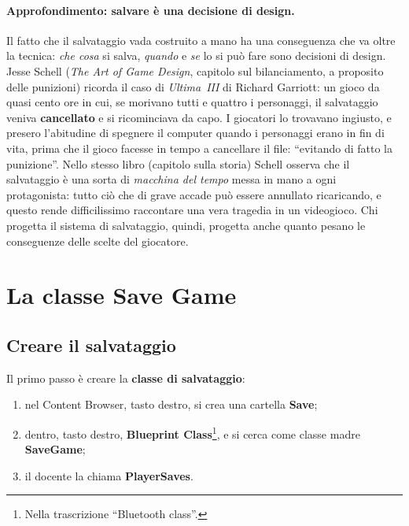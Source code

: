 \paragraph{Approfondimento: salvare è una decisione di design.} Il fatto che
il salvataggio vada costruito a mano ha una conseguenza che va oltre la
tecnica: \emph{che cosa} si salva, \emph{quando} e \emph{se} lo si può fare
sono decisioni di design. Jesse Schell (\emph{The Art of Game Design},
capitolo sul bilanciamento, a proposito delle punizioni) ricorda il caso di
\emph{Ultima~III} di Richard Garriott: un gioco da quasi cento ore in cui, se
morivano tutti e quattro i personaggi, il salvataggio veniva
\textbf{cancellato} e si ricominciava da capo. I giocatori lo trovavano
ingiusto, e presero l'abitudine di spegnere il computer quando i personaggi
erano in fin di vita, prima che il gioco facesse in tempo a cancellare il file:
``evitando di fatto la punizione''. Nello stesso libro (capitolo sulla storia)
Schell osserva che il salvataggio è una sorta di \emph{macchina del tempo}
messa in mano a ogni protagonista: tutto ciò che di grave accade può essere
annullato ricaricando, e questo rende difficilissimo raccontare una vera
tragedia in un videogioco. Chi progetta il sistema di salvataggio, quindi,
progetta anche quanto pesano le conseguenze delle scelte del giocatore.

\section{La classe Save Game}
\label{gd16:sec:savegame}

\subsection{Creare il salvataggio}

Il primo passo è creare la \textbf{classe di salvataggio}:
\begin{enumerate}
  \item nel Content Browser, tasto destro, si crea una cartella
        \textbf{Save};
  \item dentro, tasto destro, \textbf{Blueprint Class}\footnote{Nella
        trascrizione ``Bluetooth class''.}, e si cerca come classe madre
        \textbf{SaveGame};
  \item il docente la chiama \textbf{PlayerSaves}.
\end{enumerate}

